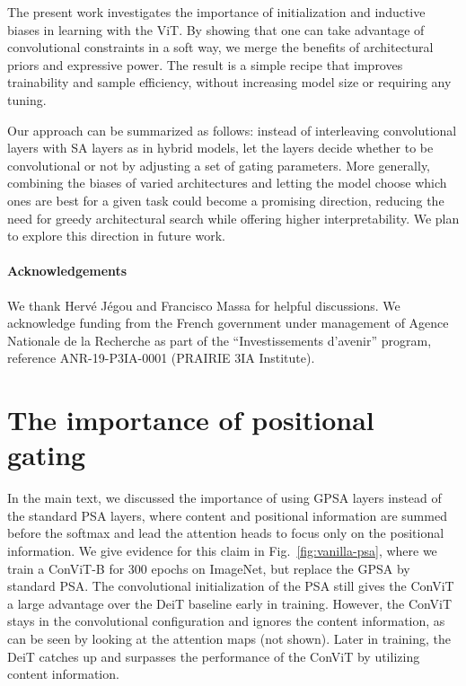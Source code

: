 \documentclass[a4paper,11pt,twocolumn]{article}
\begin{document}
The present work investigates the importance of initialization and inductive biases in learning with the ViT. By showing that one can take advantage of convolutional constraints in a soft way, we merge the benefits of architectural priors and expressive power. The result is a simple recipe that improves trainability and sample efficiency, without increasing model size or requiring any tuning. 

Our approach can be summarized as follows: instead of interleaving convolutional layers with SA layers as in hybrid models, let the layers decide whether to be convolutional or not by adjusting a set of gating parameters. More generally, combining the biases of varied architectures and letting the model choose which ones are best for a given task could become a promising direction, reducing the need for greedy architectural search while offering higher interpretability. We plan to explore this direction in future work.








 \paragraph{Acknowledgements}
We thank Hervé Jégou and Francisco Massa for helpful discussions. We acknowledge funding from the French government under management of Agence Nationale de la Recherche as part of the “Investissements d’avenir” program, reference ANR-19-P3IA-0001 (PRAIRIE 3IA Institute).  
\clearpage
\printbibliography

\clearpage
\appendix
{}\clearpage
\onecolumn










\section{The importance of positional gating}
\label{app:without-gpsa}

In the main text, we discussed the importance of using GPSA layers instead of the standard PSA layers, where content and positional information are summed before the softmax and lead the attention heads to focus only on the positional information. 
We give evidence for this claim in Fig.~\ref{fig:vanilla-psa}, where we train a ConViT-B for 300 epochs on ImageNet, but replace the GPSA by standard PSA. The convolutional initialization of the PSA still gives the ConViT a large advantage over the DeiT baseline early in training. However, the ConViT stays in the convolutional configuration and ignores the content information, as can be seen by looking at the attention maps (not shown). Later in training, the DeiT catches up and surpasses the performance of the ConViT by utilizing content information.
\end{document}
